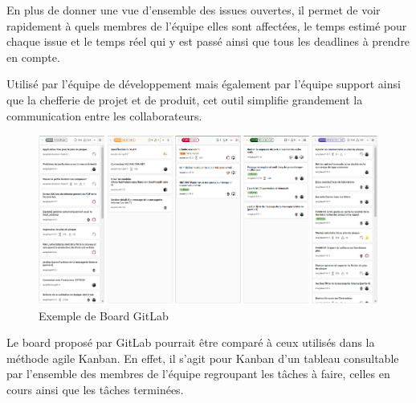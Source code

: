En plus de donner une vue d’ensemble des issues ouvertes, il permet de voir rapidement à quels membres de l’équipe elles sont affectées, le temps estimé pour chaque issue et le temps réel qui y est passé ainsi que tous les deadlines à prendre en compte. 

Utilisé par l’équipe de développement mais également par l’équipe support ainsi que la chefferie de projet et de produit, cet outil simplifie grandement la communication entre les collaborateurs.
\begin{figure}[hp]
    \centering
    \includegraphics{images/board_gitlab.png}
    \caption{Exemple de Board GitLab}
\end{figure}

Le board proposé par GitLab pourrait être comparé à ceux utilisés dans la méthode agile Kanban. En effet, il s’agit pour Kanban d’un tableau consultable par l’ensemble des membres de l’équipe regroupant les tâches à faire, celles en cours ainsi que les tâches terminées.